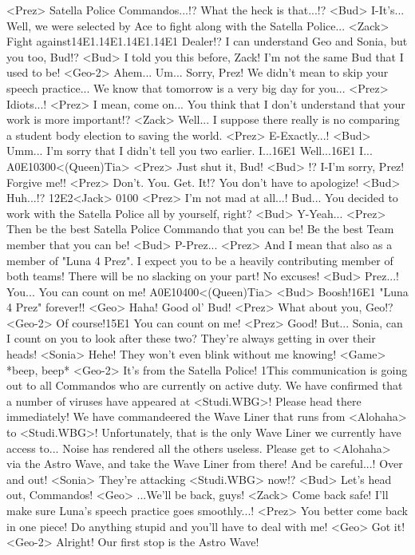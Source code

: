 <Prez> Satella Police Commandos...!? 
What the heck is that...!? 
<Bud> I-It's... 
Well, we were selected by Ace to fight along with the Satella Police... 
<Zack> Fight against{14}{E1}.{14}{E1}.{14}{E1}.{14}{E1} Dealer!? 
I can understand Geo and Sonia, but you too, Bud!? 
<Bud> I told you this before, Zack! 
I'm not the same Bud that I used to be! 
<Geo-2> Ahem... Um... 
Sorry, Prez! 
We didn't mean to skip your speech practice... 
We know that tomorrow is a very big day for you... 
<Prez> Idiots...! 
<Prez> I mean, come on... 
You think that I don't understand that your work is more important!? 
<Zack> Well... 
I suppose there really is no comparing a student body election to saving the world. 
<Prez> E-Exactly...! 
<Bud> Umm... 
I'm sorry that I didn't tell you two earlier. 
I...{16}{E1} Well...{16}{E1} I... 
{A0}{E1}{03}{00}<(Queen)Tia> 
<Prez> Just shut it, Bud! 
<Bud> !? 
I-I'm sorry, Prez! Forgive me!! 
<Prez> Don't. You. Get. It!? 
You don't have to apologize! 
<Bud> Huh...!? 
{12}{E2}<Jack> {01}{00} 
<Prez> I'm not mad at all...! 
Bud... 
You decided to work with the Satella Police all by yourself, right? 
<Bud> Y-Yeah... 
<Prez> Then be the best Satella Police Commando that you can be! 
Be the best Team member that you can be! 
<Bud> P-Prez... 
<Prez> And I mean that also as a member of "Luna 4 Prez". 
I expect you to be a heavily contributing member of both teams! 
There will be no slacking on your part! No excuses! 
<Bud> Prez...! You... You can count on me! 
{A0}{E1}{04}{00}<(Queen)Tia> 
<Bud> Boosh!{16}{E1} "Luna 4 Prez" forever!! 
<Geo> Haha! Good ol' Bud! 
<Prez> What about you, Geo!? 
<Geo-2> Of course!{15}{E1} You can count on me! 
<Prez> Good! 
But... Sonia, can I count on you to look after these two? 
They're always getting in over their heads! 
<Sonia> Hehe! They won't even blink without me knowing! 
<Game> *beep, beep* 
<Geo-2> It's from the Satella Police! 
1This communication is going out to all Commandos who are currently on active duty. 
We have confirmed that a number of viruses have appeared at <Studi.WBG>! 
Please head there immediately! 
We have commandeered the Wave Liner that runs from <Alohaha> to <Studi.WBG>! 
Unfortunately, that is the only Wave Liner we currently have access to... 
Noise has rendered all the others useless. 
Please get to <Alohaha> via the Astro Wave, and take the Wave Liner from there! 
And be careful...! 
Over and out! 
<Sonia> They're attacking <Studi.WBG> now!? 
<Bud> Let's head out, Commandos! 
<Geo> ...We'll be back, guys! 
<Zack> Come back safe! 
I'll make sure Luna's speech practice goes smoothly...! 
<Prez> You better come back in one piece! 
Do anything stupid and you'll have to deal with me! 
<Geo> Got it! 
<Geo-2> Alright! Our first stop is the Astro Wave! 
